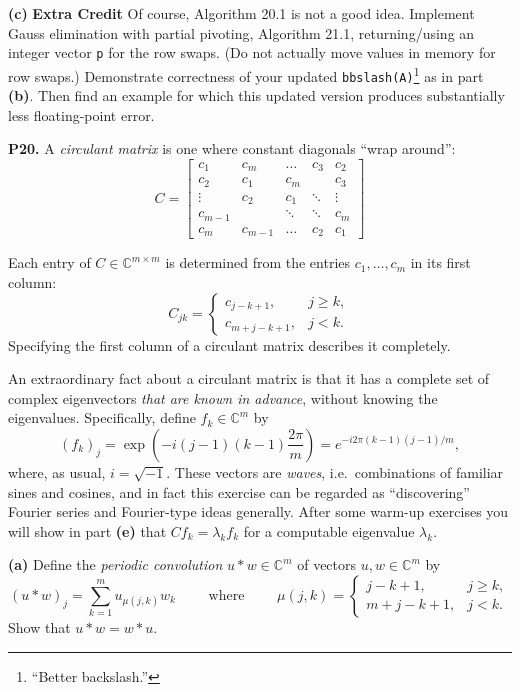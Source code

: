 \documentclass[12pt]{amsart}
\newcommand{\CC}{\mathbb{C}}
\newcommand{\prob}[1]{\bigskip\noindent\textbf{#1.}\quad }
\newcommand{\epart}[1]{\medskip\noindent\textbf{(#1)}\quad }
\begin{document}
\epart{c}  \textbf{Extra Credit} \quad Of course, Algorithm 20.1 is not a good idea.  Implement Gauss elimination with partial pivoting, Algorithm 21.1, returning/using an integer vector \texttt{p} for the row swaps.  (Do not actually move values in memory for row swaps.)  Demonstrate correctness of your updated \verb|bbslash(A)|\footnote{``Better backslash.''} as in part \textbf{(b)}.  Then find an example for which this updated version produces substantially less floating-point error.


\prob{P20}   A \emph{circulant matrix} is one where constant diagonals ``wrap around'':
\begin{equation} \label{circuC}
C = \begin{bmatrix}
	c_1 & c_{m} & \dots & c_3 & c_2 \\
	c_2 & c_1 & c_{m} & & c_3 \\
	\vdots & c_2 & c_1 & \ddots & \vdots \\
	c_{m-1} & & \ddots & \ddots & c_{m} \\
	c_{m} & c_{m-1} & \dots & c_2 & c_1
	\end{bmatrix}
\end{equation}
\smallskip

\noindent Each entry of $C \in \CC^{m\times m}$ is determined from the entries $c_1, \dots, c_{m}$ in its first column:
	$$C_{jk} = \begin{cases}
	c_{j-k + 1}, & j \ge k, \\
	c_{m + j-k + 1}, & j < k.
	\end{cases}$$
Specifying the first column of a circulant matrix describes it completely.

An extraordinary fact about a circulant matrix is that it has a complete set of complex eigenvectors \emph{that are known in advance}, without knowing the eigenvalues.  Specifically, define $f_k \in \CC^m$ by
\begin{equation}
(f_k)_j = \exp\left(-i(j-1) (k-1) \frac{2\pi}{m}\right) = e^{-i 2\pi (k-1)(j-1)/m}, \label{circulantev}
\end{equation}
where, as usual, $i=\sqrt{-1}$.  These vectors are \emph{waves}, i.e.~combinations of familiar sines and cosines, and in fact this exercise can be regarded as ``discovering'' Fourier series and Fourier-type ideas generally.  After some warm-up exercises you will show in part \textbf{(e)} that $C f_k = \lambda_k f_k$ for a computable eigenvalue $\lambda_k$.

\epart{a}  Define the \emph{periodic convolution} $u \ast w\in \CC^m$ of vectors $u,w\in \CC^m$ by
	$$(u\ast w)_j = \sum_{k=1}^m u_{\mu(j,k)} w_k \qquad \text{ where } \qquad \mu(j,k) = \begin{cases}
	j-k + 1, & j \ge k, \\
	m + j-k + 1, & j < k.
	\end{cases}$$
Show that $u\ast w = w\ast u$.
\end{document}
